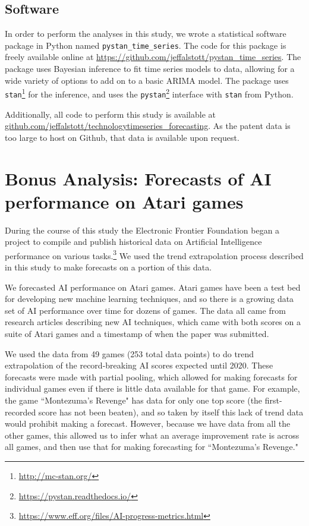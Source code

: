 \documentclass{article}
\begin{document}
\subsection{Software}
In order to perform the analyses in this study, we wrote a statistical software package in Python named \verb$pystan_time_series$. The code for this package is freely available online at \url{https://github.com/jeffalstott/pystan_time_series}. The package uses Bayesian inference to fit time series models to data, allowing for a wide variety of options to add on to a basic ARIMA model. The package uses \verb$stan$\footnote{\url{http://mc-stan.org/}} for the inference, and uses the \verb$pystan$\footnote{\url{https://pystan.readthedocs.io/}} interface with \verb$stan$ from Python.

Additionally, all code to perform this study is available at \url{github.com/jeffalstott/technologytimeseries_forecasting}. As the patent data is too large to host on Github, that data is available upon request.

\clearpage

\section{Bonus Analysis: Forecasts of AI performance on Atari games}\label{Atari_section}
During the course of this study the Electronic Frontier Foundation began a project to compile and publish historical data on Artificial Intelligence performance on various tasks.\footnote{\url{https://www.eff.org/files/AI-progress-metrics.html}} We used the trend extrapolation process described in this study to make forecasts on a portion of this data. 

We forecasted AI performance on Atari games. Atari games have been a test bed for developing new machine learning techniques, and so there is a growing data set of AI performance over time for dozens of games. The data all came from research articles describing new AI techniques, which came with both scores on a suite of Atari games and a timestamp of when the paper was submitted. 

We used the data from 49 games (253 total data points) to do trend extrapolation of the record-breaking AI scores expected until 2020. These forecasts were made with partial pooling, which allowed for making forecasts for individual games even if there is little data available for that game. For example, the game ``Montezuma's Revenge" has data for only one top score (the first-recorded score has not been beaten), and so taken by itself this lack of trend data would prohibit making a forecast. However, because we have data from all the other games, this allowed us to infer what an average improvement rate is across all games, and then use that for making forecasting for ``Montezuma's Revenge."
\end{document}
